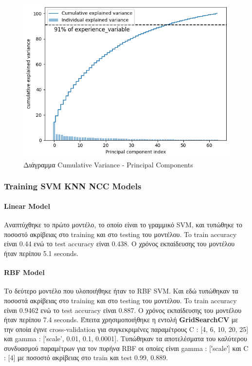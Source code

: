 \begin{figure}[ht]
	\centering
	\includegraphics[width=1\linewidth]{Images data1/KPCARBF2plot.png}
	\caption{ Διάγραμμα Cumulative Variance - Principal Components }
	\label{f:g5}	
\end{figure}
\clearpage
\subsubsection{Training SVM KNN NCC Models}

\paragraph{Linear Model}

Αναπτύχθηκε το πρώτο μοντέλο, το οποίο είναι το γραμμικό SVM, και
τυπώθηκε το ποσοστό ακρίβειας στο training και στο testing του μοντέλου. To train accuracy είναι 0.44 ενώ το test
accuracy είναι 0.438. Ο χρόνος εκπαίδευσης του μοντέλου ήταν περίπου 5.1 seconds.

\paragraph{RBF Model}
\clearline
Το δεύτερο μοντέλο που υλοποιήθηκε ήταν το RBF SVM. Και εδώ τυπώθηκαν τα ποσοστά
ακρίβειας στο training και στο testing του μοντέλου. To train accuracy είναι 0.9462 ενώ το test accuracy είναι 0.887. Ο χρόνος εκπαίδευσης του μοντέλου ήταν περίπου 7.4 seconds.
Έπειτα χρησιμοποιήθηκε η εντολή \textbf{GridSearchCV} με την οποία έγινε cross-validation για συγκεκριμένες παραμέτρους C : [4, 6, 10, 20, 25] και gamma : [′scale', 0.01, 0.1, 0.0001]. Τυπώθηκαν τα αποτελέσματα του καλύτερου
συνδυασμού παραμέτρων για τον πυρήνα RBF οι οποίες είναι gamma : [′scale′] και C :
[4] με ποσοστό ακρίβειας στο train και test 0.99, 0.889.

